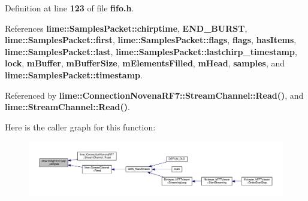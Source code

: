 Definition at line {\bf 123} of file {\bf fifo.\+h}.



References {\bf lime\+::\+Samples\+Packet\+::chirptime}, {\bf E\+N\+D\+\_\+\+B\+U\+R\+ST}, {\bf lime\+::\+Samples\+Packet\+::first}, {\bf lime\+::\+Samples\+Packet\+::flags}, {\bf flags}, {\bf has\+Items}, {\bf lime\+::\+Samples\+Packet\+::last}, {\bf lime\+::\+Samples\+Packet\+::lastchirp\+\_\+timestamp}, {\bf lock}, {\bf m\+Buffer}, {\bf m\+Buffer\+Size}, {\bf m\+Elements\+Filled}, {\bf m\+Head}, {\bf samples}, and {\bf lime\+::\+Samples\+Packet\+::timestamp}.



Referenced by {\bf lime\+::\+Connection\+Novena\+R\+F7\+::\+Stream\+Channel\+::\+Read()}, and {\bf lime\+::\+Stream\+Channel\+::\+Read()}.



Here is the caller graph for this function\+:
\nopagebreak
\begin{figure}[H]
\begin{center}
\leavevmode
\includegraphics[width=350pt]{d2/d97/classlime_1_1RingFIFO_aa091522cd3ae92cdb2b9d172cf8740a5_icgraph}
\end{center}
\end{figure}


